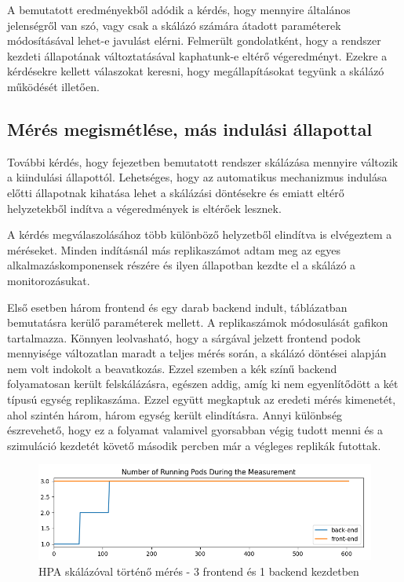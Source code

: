 A bemutatott eredményekből adódik a kérdés, hogy mennyire általános jelenségről van szó, vagy csak a skálázó számára átadott paraméterek módosításával lehet-e javulást elérni.
Felmerült gondolatként, hogy a rendszer kezdeti állapotának változtatásával kaphatunk-e eltérő végeredményt.
Ezekre a kérdésekre kellett válaszokat keresni, hogy megállapításokat tegyünk a skálázó működését illetően.


\subsection{Mérés megismétlése, más indulási állapottal}
További kérdés, hogy  fejezetben bemutatott rendszer skálázása mennyire változik a kiindulási állapottól.
Lehetséges, hogy az automatikus mechanizmus indulása előtti állapotnak kihatása lehet a skálázási döntésekre és emiatt eltérő helyzetekből indítva a végeredmények is eltérőek lesznek.

A kérdés megválaszolásához több különböző helyzetből elindítva is elvégeztem a méréseket. 
Minden indításnál más replikaszámot adtam meg az egyes alkalmazáskomponensek részére és ilyen állapotban kezdte el a skálázó a monitorozásukat.

Első esetben három frontend és egy darab backend indult,  táblázatban bemutatásra kerülő paraméterek mellett.
A replikaszámok módosulását  gafikon tartalmazza.
Könnyen leolvasható, hogy a sárgával jelzett frontend podok mennyisége változatlan maradt a teljes mérés során, a skálázó döntései alapján nem volt indokolt a beavatkozás.
Ezzel szemben a kék színű backend folyamatosan került felskálázásra, egészen addig, amíg ki nem egyenlítődött a két típusú egység replikaszáma.
Ezzel együtt megkaptuk az eredeti mérés kimenetét, ahol szintén három, három egység került elindításra.
Annyi különbség észrevehető, hogy ez a folyamat valamivel gyorsabban végig tudott menni és a szimuláció kezdetét követő második percben már a végleges replikák futottak.

\begin{figure}[!ht]
	\centering
	\includegraphics[width=150mm, keepaspectratio]{figures/HPA-scaling-from-3FE-1BE.png}
	\caption{HPA skálázóval történő mérés - 3 frontend és 1 backend kezdetben}
	\label{fig:HPA-scaling-from-3FE-1BE}
\end{figure}

